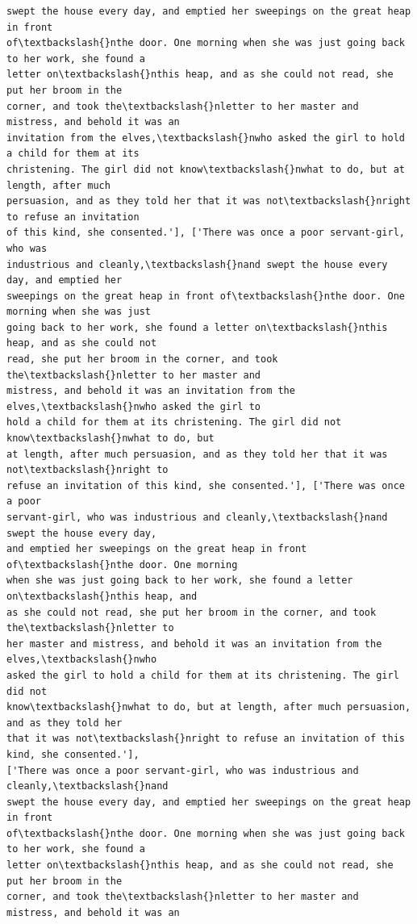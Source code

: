 \documentclass[11pt]{article}
\begin{document}
\begin{Verbatim}[commandchars=\\\{\}]
swept the house every day, and emptied her sweepings on the great heap in front
of\textbackslash{}nthe door. One morning when she was just going back to her work, she found a
letter on\textbackslash{}nthis heap, and as she could not read, she put her broom in the
corner, and took the\textbackslash{}nletter to her master and mistress, and behold it was an
invitation from the elves,\textbackslash{}nwho asked the girl to hold a child for them at its
christening. The girl did not know\textbackslash{}nwhat to do, but at length, after much
persuasion, and as they told her that it was not\textbackslash{}nright to refuse an invitation
of this kind, she consented.'], ['There was once a poor servant-girl, who was
industrious and cleanly,\textbackslash{}nand swept the house every day, and emptied her
sweepings on the great heap in front of\textbackslash{}nthe door. One morning when she was just
going back to her work, she found a letter on\textbackslash{}nthis heap, and as she could not
read, she put her broom in the corner, and took the\textbackslash{}nletter to her master and
mistress, and behold it was an invitation from the elves,\textbackslash{}nwho asked the girl to
hold a child for them at its christening. The girl did not know\textbackslash{}nwhat to do, but
at length, after much persuasion, and as they told her that it was not\textbackslash{}nright to
refuse an invitation of this kind, she consented.'], ['There was once a poor
servant-girl, who was industrious and cleanly,\textbackslash{}nand swept the house every day,
and emptied her sweepings on the great heap in front of\textbackslash{}nthe door. One morning
when she was just going back to her work, she found a letter on\textbackslash{}nthis heap, and
as she could not read, she put her broom in the corner, and took the\textbackslash{}nletter to
her master and mistress, and behold it was an invitation from the elves,\textbackslash{}nwho
asked the girl to hold a child for them at its christening. The girl did not
know\textbackslash{}nwhat to do, but at length, after much persuasion, and as they told her
that it was not\textbackslash{}nright to refuse an invitation of this kind, she consented.'],
['There was once a poor servant-girl, who was industrious and cleanly,\textbackslash{}nand
swept the house every day, and emptied her sweepings on the great heap in front
of\textbackslash{}nthe door. One morning when she was just going back to her work, she found a
letter on\textbackslash{}nthis heap, and as she could not read, she put her broom in the
corner, and took the\textbackslash{}nletter to her master and mistress, and behold it was an

\end{Verbatim}
\end{document}
